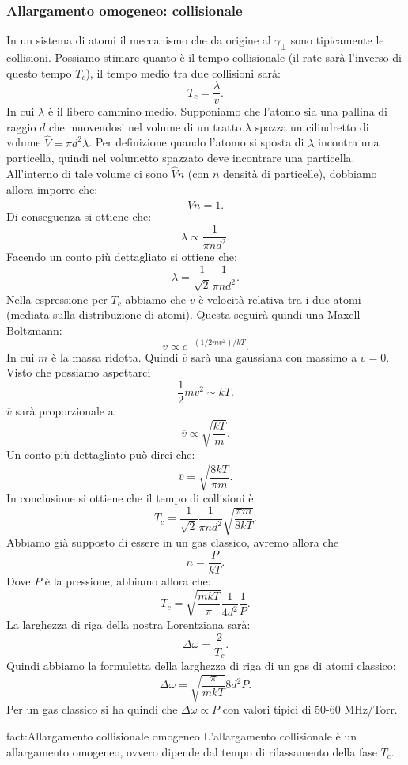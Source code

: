 \subsubsection{Allargamento omogeneo: collisionale}%
In un sistema di atomi il meccanismo che da origine al $\gamma_\perp$ sono tipicamente le collisioni. Possiamo stimare quanto è il tempo collisionale (il rate sarà l'inverso di questo tempo $T_c$), il tempo medio tra due collisioni sarà:
\[
    T_c = \frac{\lambda}{v}
.\] 
In cui $\lambda$ è il libero cammino medio. Supponiamo che l'atomo sia una pallina di raggio $d$ che muovendosi nel volume di un tratto $\lambda$ spazza un cilindretto di volume $\hat{V} = \pi d^2\lambda$. Per definizione quando l'atomo si sposta di $\lambda$ incontra una particella, quindi nel volumetto spazzato deve incontrare una particella. All'interno di tale volume ci sono $\hat{V}n$ (con $n$ densità di particelle), dobbiamo allora imporre che:
\[
    \hat{V}n = 1
.\] 
Di conseguenza si ottiene che:
\[
    \lambda  \propto \frac{1}{\pi nd^2}
.\] 
Facendo un conto più dettagliato si ottiene che:
\[
    \lambda  = \frac{1}{\sqrt{2}}\frac{1}{\pi nd^2}
.\] 
Nella espressione per $T_c$ abbiamo che $v$ è velocità relativa tra i due atomi (mediata sulla distribuzione di atomi). Questa seguirà quindi una Maxell-Boltzmann:
\[
    \overline{v} \propto e^{-(1 /2mv^2)/kT} 
.\] 
In cui $m$ è la massa ridotta. Quindi $\overline{v}$ sarà una gaussiana con massimo a $v = 0$. Visto che possiamo aspettarci 
\[
    \frac{1}{2}mv^2 \sim kT
.\] 
$\overline{v}$  sarà proporzionale a:
\[
    \overline{v} \propto \sqrt{\frac{kT}{m}} 
.\] 
Un conto più dettagliato può dirci che:
\[
    \overline{v} = \sqrt{\frac{8kT}{\pi m}} 
.\] 
In conclusione si ottiene che il tempo di collisioni è:
\[
    T_c = \frac{1}{\sqrt{2}}\frac{1}{\pi n d^2}
    \sqrt{\frac{\pi m}{8kT}} 
.\] 
Abbiamo già supposto di essere in un gas classico, avremo allora che 
\[
    n = \frac{P}{kT}
.\] 
Dove $P$ è la pressione, abbiamo allora che:
\[
    T_c = \sqrt{\frac{mkT}{\pi}} \frac{1}{4d^2}\frac{1}{P}
.\] 
La larghezza di riga della nostra Lorentziana sarà:
\[
    \Delta\omega =\frac{2}{T_c}
.\] 
Quindi abbiamo la formuletta della larghezza di riga di un gas di atomi classico:
\[
    \Delta\omega  = \sqrt{\frac{\pi}{ mkT}} 8d^2P
.\] 
Per un gas classico si ha quindi che $\Delta\omega\propto P$  con valori tipici di 50-60 MHz/Torr.\\
\begin{fact}{fact:Allargamento collisionale omogeneo}
    L'allargamento collisionale è un allargamento omogeneo, ovvero dipende dal tempo di rilassamento della fase $T_c$. 
\end{fact}
